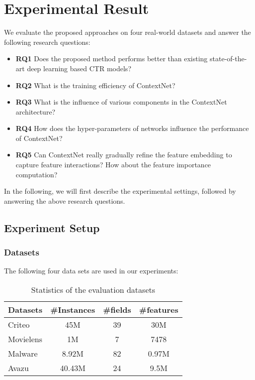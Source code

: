 \documentclass[sigconf]{acmart}
\begin{document}
\section{Experimental Result}
We evaluate the proposed approaches on four real-world datasets and answer the following research questions:

\begin{itemize}
\item\noindent\textbf{RQ1} Does the proposed method performs better than existing state-of-the-art  deep learning based CTR models?

\item\noindent\textbf{RQ2} What is the training efficiency of ContextNet?

\item\noindent\textbf{RQ3} What is the influence of various components in the ContextNet architecture?

\item\noindent\textbf{RQ4} How does the hyper-parameters of networks influence the performance of ContextNet?

\item\noindent\textbf{RQ5} Can ContextNet really gradually refine the feature embedding to capture feature interactions? How about the feature importance computation?
\end{itemize}


In the following, we will first describe the experimental settings, followed by answering the above research questions.



\subsection{Experiment Setup}

\subsubsection{Datasets}

The following four data sets are used in our experiments:

\begin{table}
\centering
\caption{Statistics of the evaluation datasets}
\begin{tabular}{lccc}
\toprule
Datasets  & \#Instances & \#fields & \#features \\
\midrule
Criteo       & 45M  & 39 & 30M     \\
Movielens & 1M & 7 & 7478 \\
Malware     & 8.92M  & 82 & 0.97M \\
Avazu       & 40.43M  & 24 & 9.5M     \\
\bottomrule
\end{tabular}
\label{tab:datasets}
\end{table}
\end{document}
